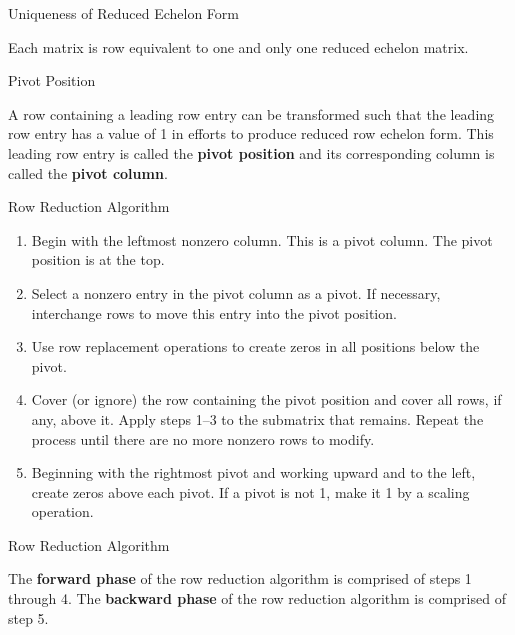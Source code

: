 \documentclass{beamer}
\begin{document}
\begin{frame}{Uniqueness of Reduced Echelon Form}
  \begin{definition}
    Each matrix is row equivalent to one and only one reduced echelon matrix. 
  \end{definition}
\end{frame}

\begin{frame}{Pivot Position}
  \begin{definition}
    A row containing a leading row entry can be transformed such that the
    leading row entry has a value of 1 in efforts to produce reduced row
    echelon form. This leading row entry is called the \textbf{pivot position}
    and its corresponding column is called the \textbf{pivot column}.
  \end{definition}
\end{frame}

\begin{frame}{Row Reduction Algorithm}
  \begin{definition}
    \begin{enumerate}
      \item Begin with the leftmost nonzero column. This is a pivot column. The pivot position is at the top.
      \item Select a nonzero entry in the pivot column as a pivot. If necessary, interchange rows to move this entry into the pivot position.
      \item Use row replacement operations to create zeros in all positions below the pivot. 
      \item Cover (or ignore) the row containing the pivot position and cover all rows, if any, above it. Apply steps 1–3 to the submatrix that remains. Repeat the process until there are no more nonzero rows to modify.
      \item Beginning with the rightmost pivot and working upward and to the left, create zeros above each pivot. If a pivot is not 1, make it 1 by a scaling operation.
    \end{enumerate}
  \end{definition}
\end{frame}

\begin{frame}{Row Reduction Algorithm}
  \begin{definition}
    The \textbf{forward phase} of the row reduction algorithm is comprised of steps 1 through 4.
    The \textbf{backward phase} of the row reduction algorithm is comprised of step 5.
  \end{definition}
\end{frame}
\end{document}
